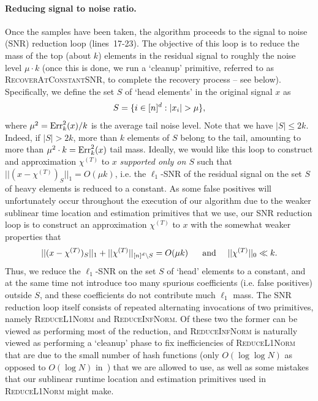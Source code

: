 \paragraph{\bf Reducing signal to noise ratio.} Once the samples have been taken, the algorithm proceeds to the signal to noise (SNR) reduction loop (lines~17-23). The objective of this loop is to reduce the mass of the top (about $k$) elements in the residual signal to roughly the noise level $\mu\cdot k$ (once this is done, we run a `cleanup' primitive, referred to as \textsc{RecoverAtConstantSNR}, to complete the recovery process -- see below). Specifically, we define the set $S$ of `head elements' in the original signal $x$ as 
\begin{equation}\label{eq:s-def-l1}
S=\{i\in \nsq: |x_i|>\mu\},
\end{equation}
where $\mu^2=\operatorname{Err}_k^2(x)/k$ is the average tail noise level. Note that we have $|S|\leq 2k$. Indeed, if $|S|>2k$, more than $k$ elements of $S$ belong to the tail, amounting to more than $\mu^2\cdot k=\operatorname{Err}_k^2(x)$ tail mass. Ideally, we would like this loop to construct and approximation  $\chi^{(T)}$ to $x$ {\em supported only on $S$} such that $||(x-\chi^{(T)})_S||_1=O(\mu k)$, i.e. the $\ell_1$-SNR of the residual signal on the set $S$ of heavy elements is reduced to a constant. 
As some false positives will unfortunately occur throughout the execution of our algorithm due to the weaker sublinear time location and estimation primitives that we use,  our SNR reduction loop is to construct an approximation $\chi^{(T)}$ to $x$ with the somewhat weaker properties that
\begin{equation}\label{eq:294ht943htgrr}
||(x-\chi^{(T)})_S||_1+||\chi^{(T)}||_{{[n]^d}\setminus S}=O(\mu k)\text{~~~~~and~~~~}||\chi^{(T)}||_0\ll k.
\end{equation}
Thus, we reduce the $\ell_1$-SNR on the set $S$ of `head' elements to a constant, and at the same time not introduce too many spurious coefficients  (i.e. false positives) outside $S$, and these coefficients do not contribute much $\ell_1$ mass. The SNR reduction loop itself consists of repeated alternating invocations of two primitives, namely \textsc{ReduceL1Norm} and \textsc{ReduceInfNorm}. Of these two the former can be viewed as performing most of the reduction, and \textsc{ReduceInfNorm} is naturally viewed as performing a `cleanup' phase to fix inefficiencies of \textsc{ReduceL1Norm} that are due to the small number of hash functions (only $O(\log\log N)$ as opposed to $O(\log N)$ in~\cite{IK14a}) that we are allowed to use, as well as some mistakes that our sublinear runtime location and estimation primitives used in \textsc{ReduceL1Norm} might make.


